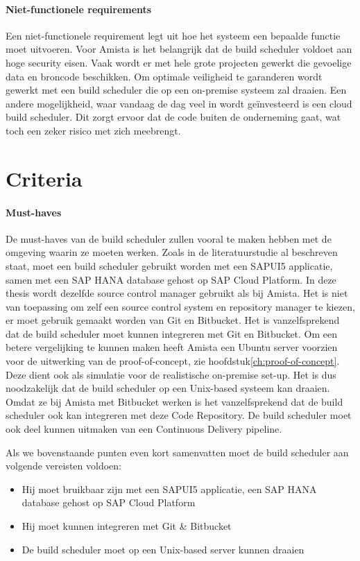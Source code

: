 \paragraph{Niet-functionele requirements}
Een niet-functionele requirement legt uit hoe het systeem een bepaalde functie moet uitvoeren. Voor Amista is het belangrijk dat de build scheduler voldoet aan hoge security eisen. Vaak wordt er met hele grote projecten gewerkt die gevoelige data en broncode beschikken. Om optimale veiligheid te garanderen wordt gewerkt met een build scheduler die op een on-premise systeem zal draaien. Een andere mogelijkheid, waar vandaag de dag veel in wordt geïnvesteerd is een cloud build scheduler. Dit zorgt ervoor dat de code buiten de onderneming gaat, wat toch een zeker risico met zich meebrengt.


\section{Criteria}
\label{sec:criteria}

\paragraph{Must-haves}
De must-haves van de build scheduler zullen vooral te maken hebben met de omgeving waarin ze moeten werken. Zoals in de literatuurstudie al beschreven staat, moet een build scheduler gebruikt worden met een SAPUI5 applicatie, samen met een SAP HANA database gehost op SAP Cloud Platform.
In deze thesis wordt dezelfde source control manager gebruikt als bij Amista. Het is niet van toepassing om zelf een source control system en repository manager te kiezen, er moet gebruik gemaakt worden van Git en Bitbucket. Het is vanzelfsprekend dat de build scheduler moet kunnen integreren met Git en Bitbucket.
Om een betere vergelijking te kunnen maken heeft Amista een Ubuntu server voorzien voor de uitwerking van de proof-of-concept, zie hoofdstuk\ref{ch:proof-of-concept}. Deze dient ook als simulatie voor de realistische on-premise set-up. Het is dus noodzakelijk dat de build scheduler op een Unix-based systeem kan draaien.
Omdat ze bij Amista met Bitbucket werken is het vanzelfsprekend dat de build scheduler ook kan integreren met deze Code Repository.
De build scheduler moet ook deel kunnen uitmaken van een Continuous Delivery pipeline.

Als we bovenstaande punten even kort samenvatten moet de build scheduler aan volgende vereisten voldoen:
\begin{itemize}
    \item Hij moet bruikbaar zijn met een SAPUI5 applicatie, een SAP HANA database gehost op SAP Cloud Platform
    \item Hij moet kunnen integreren met Git \& Bitbucket
    \item De build scheduler moet op een Unix-based server kunnen draaien
\end{itemize}


